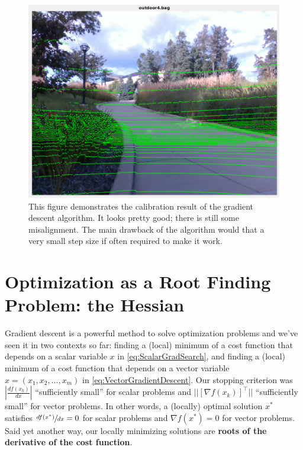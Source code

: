 \begin{figure}[H]%
    \centering
    \includegraphics[trim=0 0 0 30,clip,height=0.36\textwidth]{graphics/Chap12Optim/Result.png}
\caption[]{This figure demonstrates the calibration result of the gradient descent
algorithm. It looks pretty good; there is still some misalignment. The main drawback of the algorithm would that a very small step size if often required to make it work.}
\label{fig:GradientResult}%
\end{figure}


\newpage 

\section{Optimization as a Root Finding Problem: the Hessian}

Gradient descent is a powerful method to solve optimization problems and we've seen it in two contexts so far: finding a (local) minimum of a cost function that depends on a scalar variable $x$ in \eqref{eq:ScalarGradSearch}, and  finding a (local) minimum of a cost function that depends on a vector variable $x =\left(x_1, x_2, \ldots, x_m  \right)$ in \eqref{eq:VectorGradientDescent}. Our stopping criterion was $|\frac{df(x_k)}{dx}|$ ``sufficiently small'' for scalar problems and $||\left[\nabla f(x_k)\right]^\top||$ ``sufficiently small'' for vector problems. In other words, a (locally) optimal solution $x^\ast$ satisfies $\sfrac{df(x^\ast)}{dx}=0$ for scalar problems and $\nabla f(x^\ast)=0$ for vector problems. Said yet another way, our locally minimizing solutions are \textbf{roots of the derivative of the cost function}. \\


